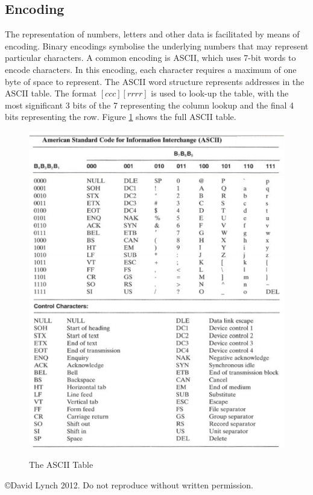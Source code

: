 \documentclass[10pt,a4paper]{article}
\begin{document}
\subsection{Encoding}
The representation of numbers, letters and other data is facilitated by means of encoding. Binary encodings symbolise the underlying numbers that may represent particular characters. A common encoding is ASCII, which uses 7-bit words to encode characters. In this encoding, each character requires a maximum of one byte of space to represent. The ASCII word structure represents addresses in the ASCII table. The format $[ccc][rrrr]$ is used to look-up the table, with the most significant 3 bits of the 7 representing the column lookup and the final 4 bits representing the row. Figure {\ref{ascii}} shows the full ASCII table. 
\begin{figure}
\caption{The ASCII Table\cite{LOGICDESIGN}}
\begin{center}
\includegraphics[scale=0.60]{../images/ascii.png}
\label{ascii}
\end{center}
\end{figure}
{}

\begin{center}
{\small \copyright  David Lynch 2012. Do not reproduce without written permission.}
\end{center}
\end{document}
